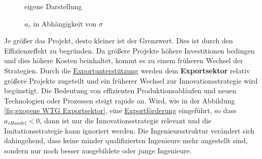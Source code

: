 %
		\begin{figure*}[h]
			\hfill{}  eigene Darstellung
			\caption{$a_r$ in Abhängigkeit von $\sigma$ }
			\label{fig:VerhaltenVonAR}
		\end{figure*}
%
Je größer das Projekt, desto kleiner ist der Grenzwert. Dies ist durch den Effizienzeffekt zu begründen. Da größere Projekte höhere Investitionen bedingen und dies höhere Kosten beinhaltet, kommt es zu einem früheren Wechsel der Strategien. 
Durch die \uline{Exportunterstützung} werden dem \textbf{Exportsektor} relativ größere Projekte zugeteilt und ein früherer Wechsel zur Innovationsstrategie wird begünstigt. Die Bedeutung von effizienten Produktionsabläufen und neuen Technologien oder Prozessen steigt rapide an. 
Wird, wie in der Abbildung \ref{fig:exogene WTG Exportsektor}, eine \uline{Exportförderung} eingeführt, so dass $a_{rHandel}<0$, dann ist  nur die \textcolor[rgb]{0.74,0.97,0.22}{Innovationsstrategie} relevant und die \textcolor[rgb]{0,0.32,0}{Imitationsstrategie} kann ignoriert werden. Die Ingenieursstruktur verändert sich dahingehend, dass keine minder qualifizierten Ingenieure mehr angestellt sind, sondern nur noch besser ausgebildete oder junge Ingenieure.\\
